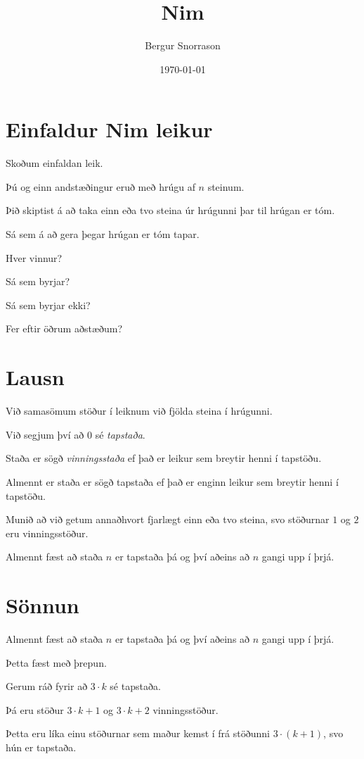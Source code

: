 \title{Nim}
\author{Bergur Snorrason}
\date{\today}



\frame{\titlepage}

\section{Einfaldur Nim leikur}
{
    {
        \item<1-> Skoðum einfaldan leik.
        \item<2-> Þú og einn andstæðingur eruð með hrúgu af $n$ steinum.
        \item<3-> Þið skiptist á að taka einn eða tvo steina úr hrúgunni þar til hrúgan er tóm.
        \item<4-> Sá sem á að gera þegar hrúgan er tóm tapar.
        \item<5-> Hver vinnur?
        {
            \item<5-> Sá sem byrjar?
            \item<5-> Sá sem byrjar ekki?
            \item<5-> Fer eftir öðrum aðstæðum?
        }
    }
}

\section{Lausn}
{
    {
        \item<1-> Við samasömum stöður í leiknum við fjölda steina í hrúgunni.
        \item<2-> Við segjum því að $0$ sé \emph{tapstaða}.
        \item<3-> Staða er sögð \emph{vinningsstaða} ef það er leikur sem breytir henni í tapstöðu.
        \item<4-> Almennt er staða er sögð tapstaða ef það er enginn leikur sem breytir henni í tapstöðu.
        \item<5-> Munið að við getum annaðhvort fjarlægt einn eða tvo steina, svo stöðurnar $1$ og $2$ eru vinningsstöður.
        \item<6-> Almennt fæst að staða $n$ er tapstaða þá og því aðeins að $n$ gangi upp í þrjá.
    }
}

\section{Sönnun}
{
    {
        \item<1-> Almennt fæst að staða $n$ er tapstaða þá og því aðeins að $n$ gangi upp í þrjá.
        \item<1-> Þetta fæst með þrepun.
        \item<2-> Gerum ráð fyrir að $3 \cdot k$ sé tapstaða.
        \item<3-> Þá eru stöður $3 \cdot k + 1$ og $3 \cdot k + 2$ vinningsstöður.
        \item<4-> Þetta eru líka einu stöðurnar sem maður kemst í frá stöðunni $3 \cdot (k + 1)$, svo hún er tapstaða.
    }
}

